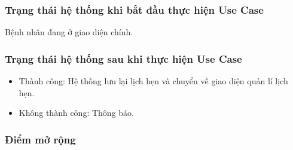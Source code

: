 \subsubsection{Trạng thái hệ thống khi bắt đầu thực hiện Use Case}
Bệnh nhân đang ở giao diện chính.

\subsubsection{Trạng thái hệ thống sau khi thực hiện Use Case}
\begin{itemize}
  \item Thành công: Hệ thống lưu lại lịch hẹn và chuyển về giao diện quản lí lịch hẹn.
  \item Không thành công: Thông báo.
\end{itemize}

\subsubsection{Điểm mở rộng}